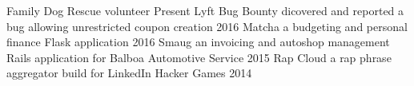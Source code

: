 \begin{cvhonors}
  \cvhonor
    {Family Dog Rescue}
    {volunteer}
    {}
    {Present}
  \cvhonor
    {Lyft Bug Bounty}
    {dicovered and reported a bug allowing unrestricted coupon creation}
    {}
    {2016}
  \cvhonor
    {Matcha}
    {a budgeting and personal finance Flask application}
    {}
    {2016}
  \cvhonor
    {Smaug}
    {an invoicing and autoshop management Rails application for Balboa Automotive Service}
    {}
    {2015}
  \cvhonor
    {Rap Cloud}
    {a rap phrase aggregator build for LinkedIn Hacker Games}
    {}
    {2014}
\end{cvhonors}
